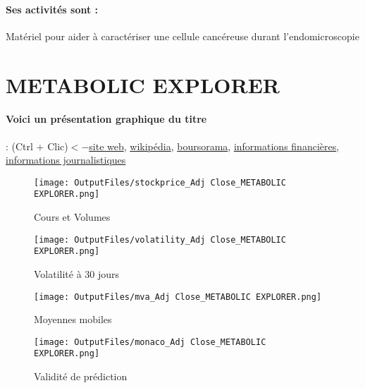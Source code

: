 \documentclass[11pt,a4paper]{report}%
\begin{document}
\paragraph{Ses activités sont : } Matériel pour aider à caractériser une cellule cancéreuse durant l’endomicroscopie 
    
    \newpage

\section{METABOLIC EXPLORER}

\paragraph{Voici un présentation graphique du titre} : (Ctrl + Clic)$<-$\href{https://www.metabolic-explorer.fr/}{site web}, \href{https://fr.wikipedia.org/wiki/Metabolic_Explorer}{wikipédia}, \href{https://www.boursorama.com/cours/1rPMETEX}{boursorama}, \href{https://www.qwant.com/?q=site:https:%2f%2fwww.easybourse.com%2faction-societe%2fMETABOLIC-EXPLORER&t=web&client=ext-firefox-hp}{informations financières}, \href{https://bourse.lerevenu.com/cours-de-bourse/fiche-valeur-synthese/METABOLIC-EXPLORER/METEX-FR}{informations journalistiques}
\begin{figure}[!htb]
   \begin{minipage}{0.5\textwidth}
     \centering
     \texttt{[image: OutputFiles/stockprice\_Adj Close\_METABOLIC EXPLORER.png]}
     \caption{Cours et Volumes}\label{Fig:price_METABOLIC EXPLORER}
   \end{minipage}\hfill
   \begin{minipage}{0.5\textwidth}
     \centering
     \texttt{[image: OutputFiles/volatility\_Adj Close\_METABOLIC EXPLORER.png]}
     \caption{Volatilité à 30 jours}\label{Fig:volat_METABOLIC EXPLORER}
   \end{minipage}
\end{figure}
\begin{figure}[!htb]
   \begin{minipage}{0.5\textwidth}
     \centering
     \texttt{[image: OutputFiles/mva\_Adj Close\_METABOLIC EXPLORER.png]}
     \caption{Moyennes mobiles}\label{Fig:mva_METABOLIC EXPLORER}
   \end{minipage}\hfill
   \begin{minipage}{0.5\textwidth}
     \centering
     \texttt{[image: OutputFiles/monaco\_Adj Close\_METABOLIC EXPLORER.png]}
     \caption{Validité de prédiction}\label{Fig:prediction_METABOLIC EXPLORER}
   \end{minipage}
\end{figure}
\end{document}
